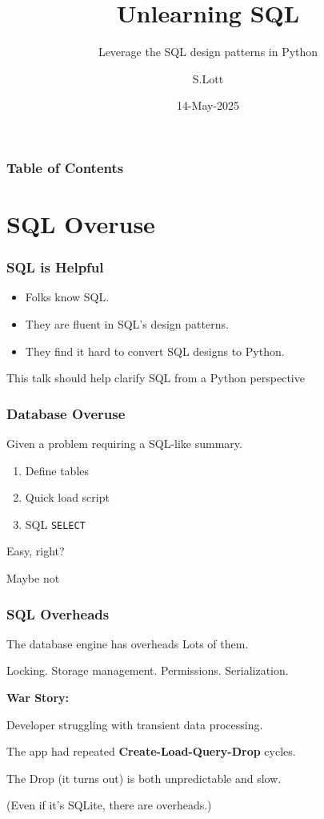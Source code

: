 \documentclass{beamer}
\title{Unlearning SQL}
\subtitle{Leverage the SQL design patterns in Python}
\author{S.Lott}
\institute{\texttt{\underline{https://fosstodon.org/@slott56}}\linebreak{}\texttt{\underline{https://github.com/slott56}}}
\date{14-May-2025}
\begin{document}
\frame{
    \titlepage
}

\begin{frame}
\frametitle{Table of Contents}
\tableofcontents
\end{frame}

\section{SQL Overuse}

\begin{frame}
    \frametitle{SQL is Helpful}

    \begin{itemize}
    \item Folks know SQL.

    \item They are fluent in SQL's design patterns.

    \item They find it hard to convert SQL designs to Python.
    \end{itemize}

    \vspace{1em}
    This talk should help clarify SQL from a Python perspective
\end{frame}

\begin{frame}
    \frametitle{Database Overuse}

    Given a problem requiring a SQL-like summary.

    \begin{enumerate}
        \item Define tables
        \item Quick load script
        \item SQL \texttt{SELECT}
    \end{enumerate}

    Easy, right? \pause

    \vspace{1em}
    Maybe not
\end{frame}

\begin{frame}
    \frametitle{SQL Overheads}

    \begin{block}{The database engine has overheads}
        Lots of them.

        Locking. Storage management. Permissions. Serialization.
    \end{block}

    \textbf{War Story:}

    Developer struggling with transient data processing.

    The app had repeated \textbf{Create-Load-Query-Drop} cycles.

    The Drop (it turns out) is both unpredictable and slow.

    (Even if it's SQLite, there are overheads.)
\end{frame}
\end{document}
